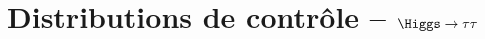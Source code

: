 \chapter{Distributions de contrôle -- $\Higgs\to\tau\tau$}\label{annexe-control_plots-HTT}

\def\EMBFFchoice{emb_ff}

